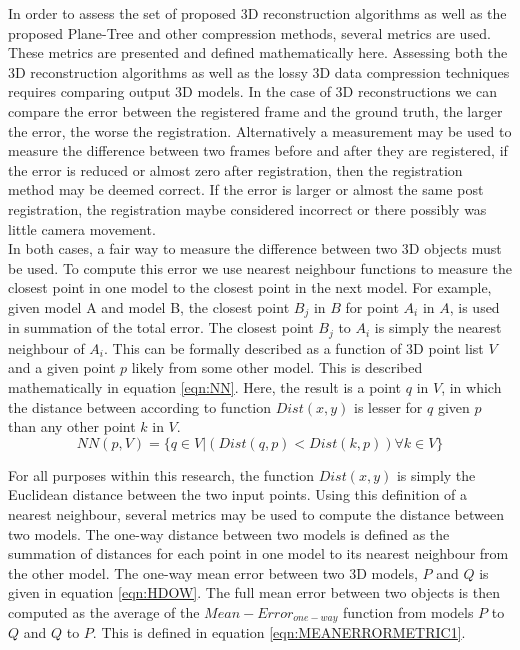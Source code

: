 
In order to assess the set of proposed 3D reconstruction algorithms as well as the proposed Plane-Tree and other compression methods, several metrics are used. These metrics are presented and defined mathematically here. Assessing both the 3D reconstruction algorithms as well as the lossy 3D data compression techniques requires comparing output 3D models. In the case of 3D reconstructions we can compare the error between the registered frame and the ground truth, the larger the error, the worse the registration. Alternatively a measurement may be used to measure the difference between two frames before and after they are registered, if the error is reduced or almost zero after registration, then the registration method may be deemed correct. If the error is larger or almost the same post registration, the registration maybe considered incorrect or there possibly was little camera movement. \\


In both cases, a fair way to measure the difference between two 3D objects must be used. To compute this error we use nearest neighbour functions to measure the closest point in one model to the closest point in the next model. For example, given model A and model B, the closest point $B_j$ in $B$ for point $A_i$ in $A$, is used in summation of the total error. The closest point $B_j$ to $A_i$ is simply the nearest neighbour of $A_i$. This can be formally described as a function of 3D point list $V$ and a given point $p$ likely from some other model. This is described mathematically in equation \ref{eqn:NN}. Here, the result is a point $q$ in $V$, in which the distance between according to function $Dist(x,y)$ is lesser for $q$ given $p$ than any other point $k$ in $V$.  \\

\begin{equation} \label{eqn:NN}
NN(p, V) =  \{ q \in V | (Dist(q, p) < Dist(k, p))  \forall k \in V \}
\end{equation}

For all purposes within this research, the function $Dist(x,y)$ is simply the Euclidean distance between the two input points. Using this definition of a nearest neighbour, several metrics may be used to compute the distance between two models. The one-way distance between two models is defined as the summation of distances for each point in one model to its nearest neighbour from the other model. The one-way mean error between two 3D models, $P$ and $Q$ is given in equation \ref{eqn:HDOW}. The full mean error between two objects is then computed as the average of the $Mean-Error_{one-way}$ function from models $P$ to $Q$ and $Q$ to $P$. This is defined in equation \ref{eqn:MEANERRORMETRIC1}. \\


